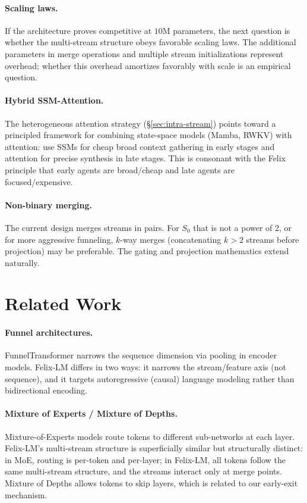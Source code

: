\documentclass[11pt,a4paper]{article}
\theoremstyle{definition}
\theoremstyle{plain}
\theoremstyle{remark}
\begin{document}
\paragraph{Scaling laws.}
If the architecture proves competitive at $10$M parameters, the next 
question is whether the multi-stream structure obeys favorable scaling 
laws. The additional parameters in merge operations and multiple stream 
initializations represent overhead; whether this overhead amortizes 
favorably with scale is an empirical question.

\paragraph{Hybrid SSM-Attention.}
The heterogeneous attention strategy (\S\ref{sec:intra-stream}) points 
toward a principled framework for combining state-space models (Mamba, 
RWKV) with attention: use SSMs for cheap broad context gathering in early 
stages and attention for precise synthesis in late stages. This is 
consonant with the Felix principle that early agents are broad/cheap and 
late agents are focused/expensive.

\paragraph{Non-binary merging.}
The current design merges streams in pairs. For $S_0$ that is not a power 
of 2, or for more aggressive funneling, $k$-way merges (concatenating $k > 
2$ streams before projection) may be preferable. The gating and projection 
mathematics extend naturally.

\section{Related Work}\label{sec:related}

\paragraph{Funnel architectures.}
FunnelTransformer \cite{dai2020funnel} narrows the sequence dimension 
via pooling in encoder models. Felix-LM differs in two ways: it narrows 
the stream/feature axis (not sequence), and it targets autoregressive 
(causal) language modeling rather than bidirectional encoding.

\paragraph{Mixture of Experts / Mixture of Depths.}
Mixture-of-Experts models \cite{shazeer2017outrageously, fedus2022switch} 
route tokens to different sub-networks at each layer. Felix-LM's 
multi-stream structure is superficially similar but structurally distinct: 
in MoE, routing is per-token and per-layer; in Felix-LM, all tokens follow 
the same multi-stream structure, and the streams interact only at merge 
points. Mixture of Depths \cite{raposo2024mixture} allows tokens to skip 
layers, which is related to our early-exit mechanism.
\end{document}
